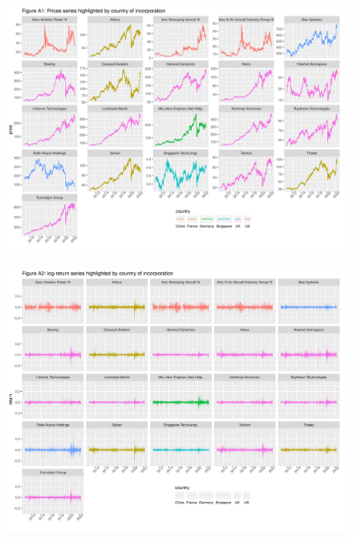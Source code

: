 \documentclass[
  letterpaper,
  DIV=11,
  numbers=noendperiod]{scrartcl}
\begin{document}
\begin{figure}
\centering
  \includegraphics{plots/figA1.png}
\end{figure}

\begin{figure}
\centering
  \includegraphics{plots/figA2.png}
\end{figure}
\end{document}
